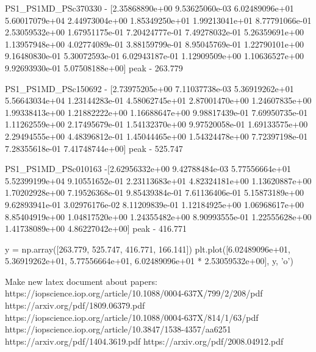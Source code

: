 \documentclass[12pt]{article}
\begin{document}
PS1_PS1MD_PSc370330 - [2.35868890e+00 9.53625060e-03 6.02489096e+01 5.60017079e+04
 2.44973004e+00 1.85349250e+01 1.99213041e+01 8.77791066e-01
 2.53059532e+00 1.67951175e-01 7.20424777e-01 7.49278032e-01
 5.26359691e+00 1.13957948e+00 4.02774089e-01 3.88159799e-01
 8.95045769e-01 1.22790101e+00 9.16480830e-01 5.30072593e-01
 6.02943187e-01 1.12909509e+00 1.10636527e+00 9.92693930e-01
 5.07508188e+00]
peak - 263.779

PS1_PS1MD_PSc150692 - [2.73975205e+00 7.11037738e-03 5.36919262e+01 5.56643034e+04
 1.23144283e-01 4.58062745e+01 2.87001470e+00 1.24607835e+00
 1.99338413e+00 1.21882222e+00 1.16688647e+00 9.98817439e-01
 7.69950735e-01 1.11262559e+00 2.17495679e-01 1.54132370e+00
 9.97520058e-01 1.69133575e+00 2.29494555e+00 4.48396812e-01
 1.45044465e+00 1.54324478e+00 7.72397198e-01 7.28355618e-01
 7.41748744e+00]
peak - 525.747

PS1_PS1MD_PSc010163 -[2.62956332e+00 9.42788484e-03 5.77556664e+01 5.52399199e+04
 9.10551652e-01 2.23113683e+01 4.82324181e+00 1.13620887e+00
 1.70202928e+00 7.19526368e-01 9.85439384e-01 7.61136406e-01
 5.15873189e+00 9.62893941e-01 3.02976176e-02 8.11209839e-01
 1.12184925e+00 1.06968617e+00 8.85404919e+00 1.04817520e+00
 1.24355482e+00 8.90993555e-01 1.22555628e+00 1.41738089e+00
 4.86227042e+00]
peak - 416.771


y = np.array([263.779, 525.747, 416.771, 166.141])
plt.plot([6.02489096e+01, 5.36919262e+01, 5.77556664e+01, 6.02489096e+01 * 2.53059532e+00],
             y, 'o')


Make new latex document about papers: 
https://iopscience.iop.org/article/10.1088/0004-637X/799/2/208/pdf
https://arxiv.org/pdf/1809.06379.pdf
https://iopscience.iop.org/article/10.1088/0004-637X/814/1/63/pdf
https://iopscience.iop.org/article/10.3847/1538-4357/aa6251
https://arxiv.org/pdf/1404.3619.pdf
https://arxiv.org/pdf/2008.04912.pdf 
\fi 
\end{document}
